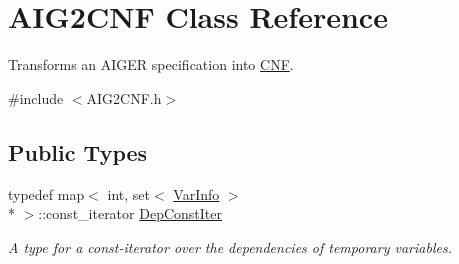 \hypertarget{classAIG2CNF}{\section{A\-I\-G2\-C\-N\-F Class Reference}
\label{classAIG2CNF}
}


Transforms an A\-I\-G\-E\-R specification into \hyperlink{classCNF}{C\-N\-F}.  




{\ttfamily \#include $<$A\-I\-G2\-C\-N\-F.\-h$>$}

\subsection*{Public Types}
\begin{DoxyCompactItemize}
\item 
typedef map$<$ int, set$<$ \hyperlink{classVarInfo}{Var\-Info} $>$\\*
 $>$\-::const\-\_\-iterator \hyperlink{classAIG2CNF_a2f57817266c9a882dffc8c5dab1fd3c4}{Dep\-Const\-Iter}
\begin{DoxyCompactList}\small\item\em A type for a const-\/iterator over the dependencies of temporary variables. \end{DoxyCompactList}\end{DoxyCompactItemize}
